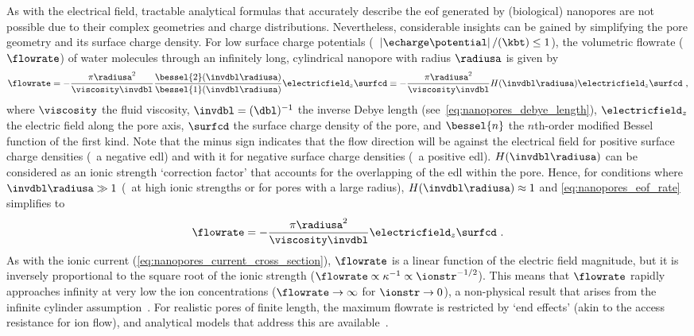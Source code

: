 As with the electrical field, tractable analytical formulas that accurately describe the \gls{eof} generated
by (biological) nanopores are not possible due to their complex geometries and charge distributions.
Nevertheless, considerable insights can be gained by simplifying the pore geometry and its surface charge
density. For low surface charge potentials (\ie~$\left| \echarge \potential\right| / (\kbt) \le 1$), the
volumetric flowrate ($\flowrate$) of water molecules through an infinitely long, cylindrical nanopore with
radius $\radiusa$ is given by~\cite{Laohakunakorn-2015}
%
\begin{equation}\label{eq:nanopores_eof_rate}
  \flowrate = - \dfrac{\pi \radiusa^2}{\viscosity \invdbl} 
  \dfrac{ \bessel{2} ( \invdbl \radiusa ) }{ \bessel{1} (\invdbl \radiusa) }
  \electricfield_z \surfcd
  \equiv - \dfrac{\pi \radiusa^2}{\viscosity \invdbl} H(\invdbl \radiusa) \electricfield_z \surfcd
  \text{ ,}
\end{equation}
%
where $\viscosity$ the fluid viscosity, $\invdbl = (\dbl)^{-1}$ the inverse Debye length
(see~\cref{eq:nanopores_debye_length}), $\electricfield_z$ the electric field along the pore axis, $\surfcd$
the surface charge density of the pore, and $\bessel{n}$ the $n$th-order modified Bessel function of the first
kind. Note that the minus sign indicates that the flow direction will be against the electrical field for
positive surface charge densities (\ie~a negative \gls{edl}) and with it for negative surface charge densities
(\ie~a positive \gls{edl}). $H(\invdbl \radiusa)$ can be considered as an ionic strength `correction factor'
that accounts for the overlapping of the \gls{edl} within the pore. Hence, for conditions where $\invdbl
\radiusa \gg 1$ (\eg~at high ionic strengths or for pores with a large radius), $H(\invdbl \radiusa) \approx
1$ and \cref{eq:nanopores_eof_rate} simplifies to
%
\begin{equation}\label{eq:nanopores_eof_rate_simple}
  \flowrate = - \dfrac{\pi \radiusa^2}{\viscosity \invdbl} \electricfield_z \surfcd
  \text{ .}
\end{equation}
%
As with the ionic current (\cref{eq:nanopores_current_cross_section}), $\flowrate$ is a linear function of the
electric field magnitude, but it is inversely proportional to the square root of the ionic strength
($\flowrate \propto \kappa^{-1} \propto \ionstr^{-1/2}$). This means that $\flowrate$ rapidly approaches
infinity at very low the ion concentrations  ($\flowrate \to \infty$ for $\ionstr \to 0$), a non-physical
result that arises from the infinite cylinder assumption~\cite{Mao-2014}. For realistic pores of finite
length, the maximum flowrate is restricted by `end effects' (akin to the access resistance for ion flow), and
analytical models that address this are available~\cite{Sherwood-2014}.

